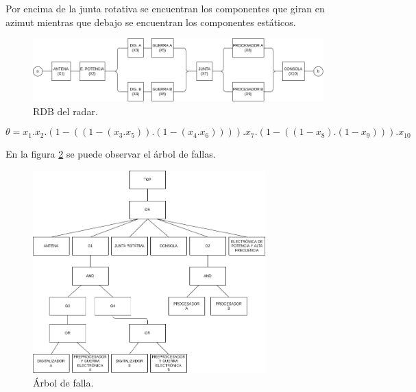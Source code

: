 \documentclass[
    11pt,
    spanish,
    a4paper
]{article}
\begin{document}
Por encima de la junta rotativa se encuentran los componentes que giran en azimut mientras que debajo se encuentran los componentes estáticos.

\begin{figure}[htbp]
	\centering
	\includegraphics[width=\textwidth]{img/rdb_radar.png}
	\caption{RDB del radar.}
	\label{fig:rdb_radar}
\end{figure}


\begin{dmath}
	\theta = x_1 . x_2 . (1 - ((1 - (x_3 . x_5)) . (1-(x_4 . x_6)) )) . x_7 . (1 - ((1 - x_8).(1 - x_9))) . x_{10}
\end{dmath}

En la figura \ref{fig:arbol} se puede observar el árbol de fallas.

\begin{figure}[htbp]
	\centering
	\includegraphics[width=0.8\textwidth]{img/arbol_radar.png}
	\caption{Árbol de falla.}
	\label{fig:arbol}
\end{figure}
\end{document}
